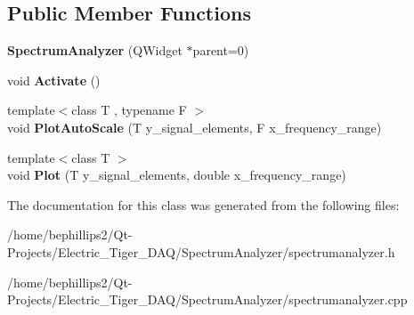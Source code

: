 \subsection*{Public Member Functions}
\begin{DoxyCompactItemize}
\item 
{\bfseries Spectrum\+Analyzer} (Q\+Widget $\ast$parent=0)\hypertarget{class_spectrum_analyzer_aef258c587abbeb0b11cb765e5aeee636}{}\label{class_spectrum_analyzer_aef258c587abbeb0b11cb765e5aeee636}

\item 
void {\bfseries Activate} ()\hypertarget{class_spectrum_analyzer_a43c0254f91c46314e69b1eddfb772025}{}\label{class_spectrum_analyzer_a43c0254f91c46314e69b1eddfb772025}

\item 
{\footnotesize template$<$class T , typename F $>$ }\\void {\bfseries Plot\+Auto\+Scale} (T y\+\_\+signal\+\_\+elements, F x\+\_\+frequency\+\_\+range)\hypertarget{class_spectrum_analyzer_aea2fdc60afeb7dec99f301ff8f6a763c}{}\label{class_spectrum_analyzer_aea2fdc60afeb7dec99f301ff8f6a763c}

\item 
{\footnotesize template$<$class T $>$ }\\void {\bfseries Plot} (T y\+\_\+signal\+\_\+elements, double x\+\_\+frequency\+\_\+range)\hypertarget{class_spectrum_analyzer_adcbfcead7bbd400467e14c681a551d62}{}\label{class_spectrum_analyzer_adcbfcead7bbd400467e14c681a551d62}

\end{DoxyCompactItemize}


The documentation for this class was generated from the following files\+:\begin{DoxyCompactItemize}
\item 
/home/bephillips2/\+Qt-\/\+Projects/\+Electric\+\_\+\+Tiger\+\_\+\+D\+A\+Q/\+Spectrum\+Analyzer/spectrumanalyzer.\+h\item 
/home/bephillips2/\+Qt-\/\+Projects/\+Electric\+\_\+\+Tiger\+\_\+\+D\+A\+Q/\+Spectrum\+Analyzer/spectrumanalyzer.\+cpp\end{DoxyCompactItemize}
